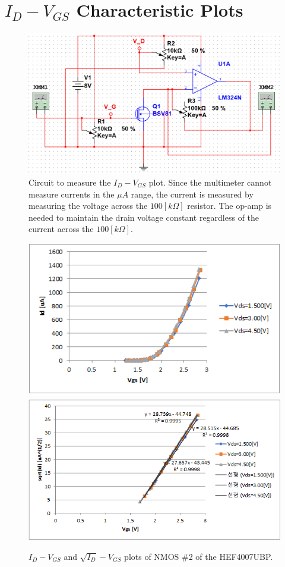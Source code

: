 \documentclass[a4paper, itemph]{oblivoir}
\theoremstyle{definition}
\begin{document}
\section{$I_D-V_{GS}$ Characteristic Plots}
\begin{figure}[htb]
    \centering
    \includegraphics[width=0.465\linewidth]{MOSFET_circuit.PNG}
    \caption{Circuit to measure the $I_D-V_{GS}$ plot. Since the multimeter cannot measure currents in the $\mu A$ range, the current is measured by measuring the voltage across the $100[k\Omega]$ resistor. The op-amp is needed to maintain the drain voltage constant regardless of the current across the $100[k\Omega]$.}
\end{figure}
\begin{figure}[htb]
    \centering
    \includegraphics{Vgs-Id_nmos.png}
    \includegraphics[width=0.465\linewidth]{Vgs-sqrt(Id)_nmos.png}
    \caption{$I_D-V_{GS}$ and $\sqrt{I_D}-V_{GS}$ plots of NMOS \#2 of the HEF4007UBP.}
\end{figure}
\end{document}
